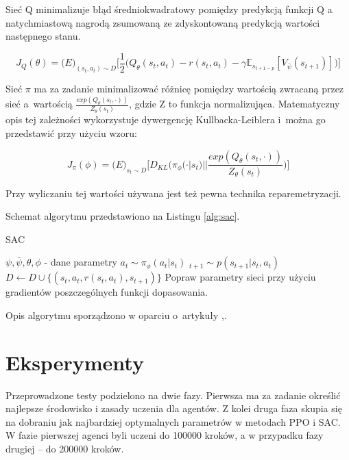 \documentclass[a4paper,12pt]{article}
\let\oldsection\section
\renewcommand\section{\clearpage\oldsection}
\begin{document}
Sieć Q minimalizuje błąd średniokwadratowy pomiędzy predykcją funkcji Q a natychmiastową nagrodą zsumowaną ze zdyskontowaną predykcją wartości następnego stanu.

\begin{equation}
	J_Q(\theta) = \mathbb(E)_{(s_t,a_t) \sim D}\Big[
		\frac{1}{2} \big(
			Q_\theta(s_t,a_t) - r(s_t,a_t) - \gamma \mathbb{E}_{s_{t+1 \sim p}}[V_{\bar{\psi}}(s_{t+1})]
		\big)
	\Big]
\end{equation}

Sieć $\pi$ ma za zadanie minimalizować różnicę pomiędzy wartością zwracaną przez sieć  a~wartością $\frac{exp(Q_\theta(s_t,\cdot))}{Z_\theta(s_t)}$, gdzie Z to funkcja normalizująca. Matematyczny opis tej zależności wykorzystuje dywergencję Kullbacka-Leiblera i~można go przedstawić przy użyciu wzoru:

\begin{equation}
	J_\pi(\phi) = \mathbb(E)_{s_t \sim D}\Big[ D_{KL} \big(\pi_\phi(\cdot|s_t) || \frac{exp(Q_\theta(s_t,\cdot))}{Z_\theta(s_t)}  \big) \Big]
\end{equation}

Przy wyliczaniu tej wartości używana jest też pewna technika reparemetryzacji.



Schemat algorytmu przedstawiono na Listingu \ref{alg:sac}.
\begin{algorithm}[h!]
	\caption{SAC}
	\label{alg:sac}
	\begin{algorithmic}[1]
		\STATE $\psi, \bar{\psi}, \theta,\phi$ - dane parametry
				\STATE $a_t \sim \pi_{\phi}(a_t|s_t)$
				\STATE $_{t+1} \sim p(s_{t+1}|s_t,a_t)$
				\STATE $D \gets D \cup \{(s_t,a_t,r(s_t,a_t),s_{t+1})\}$
			\ENDFOR
		\ENDFOR
		\STATE Popraw parametry sieci przy użyciu gradientów poszczególnych funkcji dopasowania.
	\end{algorithmic}
\end{algorithm}

Opis algorytmu sporządzono w oparciu o~artykuły \cite{kumar},\cite{nieznany}.

\section{Eksperymenty}
Przeprowadzone testy podzielono na dwie fazy. Pierwsza ma za zadanie określić najlepsze środowisko i zasady uczenia dla agentów. Z kolei druga faza skupia się na dobraniu jak najbardziej optymalnych parametrów w metodach PPO i SAC. W fazie pierwszej agenci byli uczeni do 100000 kroków, a w przypadku fazy drugiej -- do 200000 kroków.
\end{document}
